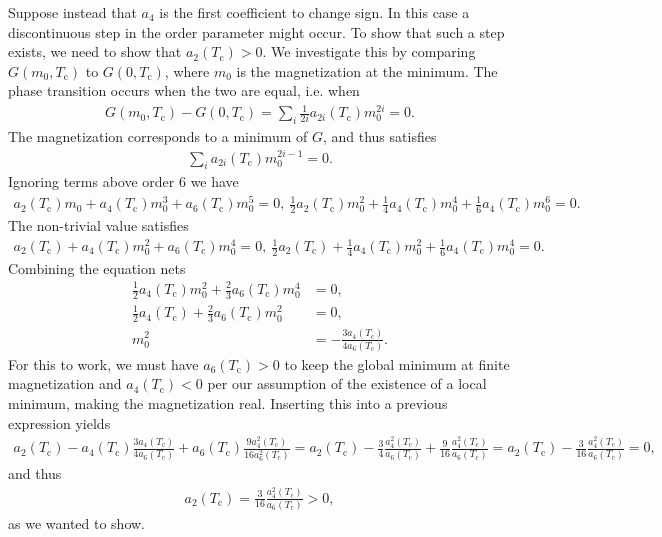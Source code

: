 Suppose instead that $a_{4}$ is the first coefficient to change sign. In this case a discontinuous step in the order parameter might occur. To show that such a step exists, we need to show that $a_{2}(T_{\text{c}}) > 0$. We investigate this by comparing $G(m_{0}, T_{\text{c}})$ to $G(0, T_{\text{c}})$, where $m_{0}$ is the magnetization at the minimum. The phase transition occurs when the two are equal, i.e. when
\begin{align*}
	G(m_{0}, T_{\text{c}}) - G(0, T_{\text{c}}) = \sum\limits_{i}\frac{1}{2i}a_{2i}(T_{\text{c}})m_{0}^{2i} = 0.
\end{align*}
The magnetization corresponds to a minimum of $G$, and thus satisfies
\begin{align*}
	\sum\limits_{i}a_{2i}(T_{\text{c}})m_{0}^{2i - 1} = 0.
\end{align*}
Ignoring terms above order $6$ we have
\begin{align*}
	a_{2}(T_{\text{c}})m_{0} + a_{4}(T_{\text{c}})m_{0}^{3} + a_{6}(T_{\text{c}})m_{0}^{5} = 0,\ \frac{1}{2}a_{2}(T_{\text{c}})m_{0}^{2} + \frac{1}{4}a_{4}(T_{\text{c}})m_{0}^{4} + \frac{1}{6}a_{4}(T_{\text{c}})m_{0}^{6} = 0.
\end{align*}
The non-trivial value satisfies
\begin{align*}
	a_{2}(T_{\text{c}}) + a_{4}(T_{\text{c}})m_{0}^{2} + a_{6}(T_{\text{c}})m_{0}^{4} = 0,\ \frac{1}{2}a_{2}(T_{\text{c}}) + \frac{1}{4}a_{4}(T_{\text{c}})m_{0}^{2} + \frac{1}{6}a_{4}(T_{\text{c}})m_{0}^{4} = 0.
\end{align*}
Combining the equation nets
\begin{align*}
	\frac{1}{2}a_{4}(T_{\text{c}})m_{0}^{2} + \frac{2}{3}a_{6}(T_{\text{c}})m_{0}^{4} &= 0, \\
	\frac{1}{2}a_{4}(T_{\text{c}}) + \frac{2}{3}a_{6}(T_{\text{c}})m_{0}^{2}          &= 0, \\
	m_{0}^{2}                                                                         &= -\frac{3a_{4}(T_{\text{c}})}{4a_{6}(T_{\text{c}})}.
\end{align*}
For this to work, we must have $a_{6}(T_{\text{c}}) > 0$ to keep the global minimum at finite magnetization and $a_{4}(T_{\text{c}}) < 0$ per our assumption of the existence of a local minimum, making the magnetization real. Inserting this into a previous expression yields
\begin{align*}
	a_{2}(T_{\text{c}}) - a_{4}(T_{\text{c}})\frac{3a_{4}(T_{\text{c}})}{4a_{6}(T_{\text{c}})} + a_{6}(T_{\text{c}})\frac{9a_{4}^{2}(T_{\text{c}})}{16a_{6}^{2}(T_{\text{c}})} = a_{2}(T_{\text{c}}) - \frac{3}{4}\frac{a_{4}^{2}(T_{\text{c}})}{a_{6}(T_{\text{c}})} + \frac{9}{16}\frac{a_{4}^{2}(T_{\text{c}})}{a_{6}(T_{\text{c}})} = a_{2}(T_{\text{c}}) - \frac{3}{16}\frac{a_{4}^{2}(T_{\text{c}})}{a_{6}(T_{\text{c}})} = 0,
\end{align*}
and thus
\begin{align*}
	a_{2}(T_{\text{c}}) = \frac{3}{16}\frac{a_{4}^{2}(T_{\text{c}})}{a_{6}(T_{\text{c}})} > 0,
\end{align*}
as we wanted to show.